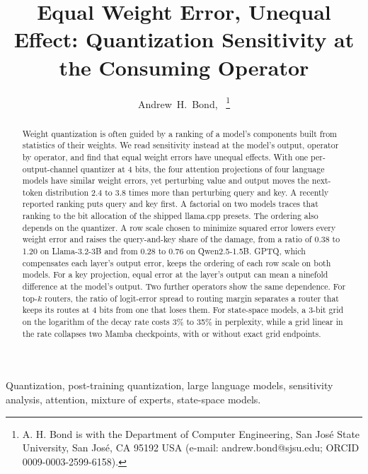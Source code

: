 \documentclass[journal]{IEEEtran}
\newif\ifanon
\begin{document}
\title{Equal Weight Error, Unequal Effect: Quantization Sensitivity at the Consuming Operator}

\ifanon
\author{Anonymous Authors}
\markboth{}{Quantization Sensitivity at the Consuming Operator}
\else
\author{Andrew~H.~Bond,~%
\thanks{A. H. Bond is with the Department of Computer Engineering, San Jos\'e State University,
San Jos\'e, CA 95192 USA (e-mail: andrew.bond@sjsu.edu; ORCID 0009-0003-2599-6158).}}
\fi

\maketitle

\begin{abstract}
Weight quantization is often guided by a ranking of a model's components built from
statistics of their weights. We read sensitivity instead at the model's output, operator by
operator, and find that equal weight errors have unequal effects. With one per-output-channel
quantizer at 4 bits, the four attention projections of four language models have similar weight
errors, yet perturbing value and output moves the next-token distribution 2.4 to 3.8 times more
than perturbing query and key. A recently reported ranking puts query and key first. A factorial
on two models traces that ranking to the bit allocation of the shipped llama.cpp presets. The
ordering also depends on the quantizer. A row scale chosen to minimize squared error lowers every
weight error and raises the query-and-key share of the damage, from a ratio of 0.38 to 1.20 on
Llama-3.2-3B and from 0.28 to 0.76 on Qwen2.5-1.5B. GPTQ, which compensates each layer's output
error, keeps the ordering of each row scale on both models. For a key projection, equal error at
the layer's output can mean a ninefold difference at the model's output. Two further operators
show the same dependence. For top-$k$ routers, the ratio of logit-error spread to routing margin
separates a router that keeps its routes at 4 bits from one that loses them. For state-space
models, a 3-bit grid on the logarithm of the decay rate costs 3\% to 35\% in perplexity, while a
grid linear in the rate collapses two Mamba checkpoints, with or without exact grid endpoints.
\end{abstract}

\begin{IEEEkeywords}
Quantization, post-training quantization, large language models, sensitivity analysis, attention,
mixture of experts, state-space models.
\end{IEEEkeywords}
\end{document}
